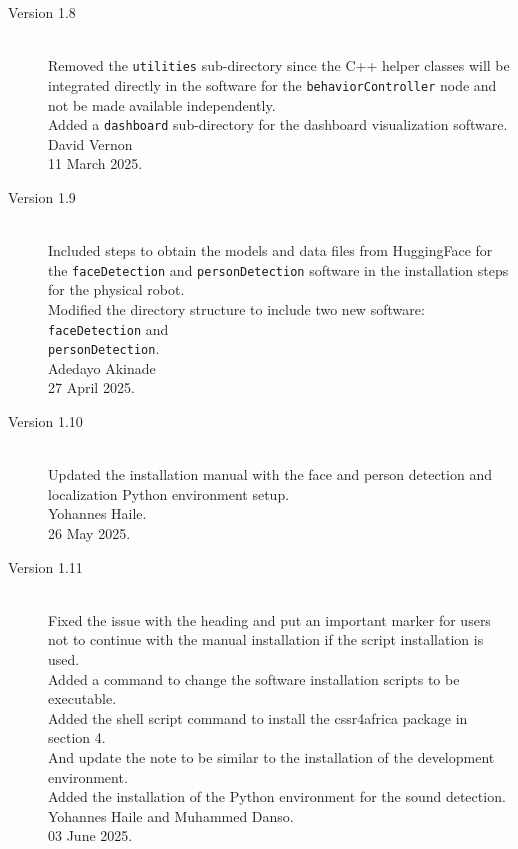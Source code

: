 \documentclass{CSSRforAfrica}
\begin{document}
{\begin{description}
			\item [Version 1.8]~\\
			Removed the {\small \tt utilities} sub-directory since the C++ helper classes will be integrated directly in the software for the {\small \tt behaviorController} node and not be made available independently.\\
			Added a  {\small \tt dashboard} sub-directory for the dashboard visualization software.\\
			David Vernon \\       
			11 March 2025.
			
			\item [Version 1.9]~\\
			Included steps to obtain the models and data files from HuggingFace for the \texttt{faceDetection} and \texttt{personDetection} software in the installation steps for the physical robot.\\
			Modified the directory structure to include two new software: \texttt{faceDetection} and \\ \texttt{personDetection}.\\
			Adedayo Akinade \\       
			27 April 2025.
			
			\item [Version 1.10]~\\
			Updated the installation manual with the face and person detection and localization Python environment setup.\\
			Yohannes Haile.\\    
			26 May 2025.
			
			\item [Version 1.11]~\\
			Fixed the issue with the heading and put an important marker for users not to continue with the manual installation if the script installation is used. \\
			Added a command to change the software installation scripts to be executable.\\
			Added the shell script command to install the cssr4africa package in section 4.\\
			And update the note to be similar to the installation of the development environment. \\
			Added the installation of the Python environment for the sound detection. \\
			Yohannes Haile and Muhammed Danso.\\
			03 June 2025.
			

\end{description}}
\end{document}
